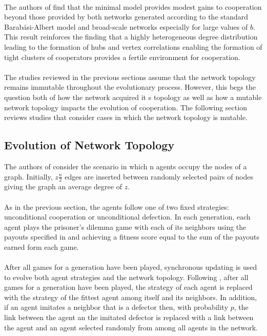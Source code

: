 \documentclass{article}
\begin{document}
	\paragraph{}The authors of \cite{Santos2006a} find that the minimal model provides modest gains to cooperation beyond those provided by both networks generated according to the standard Barab\'{a}si-Albert model and broad-scale networks especially for large values of $b$.  This result reinforces the finding that a highly heterogeneous degree distribution leading to the formation of hubs and vertex correlations enabling the formation of tight clusters of cooperators provides a fertile environment for cooperation.
	\paragraph{}The studies reviewed in the previous sections assume that the network topology remains immutable throughout the evolutionary process.  However, this begs the question both of how the network acquired it s topology as well as how a mutable network topology impacts the evolution of cooperation.  The following section reviews studies that consider cases in which the network topology is mutable.
	
	\subsection{Evolution of Network Topology} \label{evo-net-topology}
	The authors of \cite{Eguiluz2005} consider the scenario in which n agents occupy the nodes of a graph.  Initially, $z\frac{n}{2}$ edges are inserted between randomly selected pairs of nodes giving the graph an average degree of $z$.
	\paragraph{}As in the previous section, the agents follow one of two fixed strategies: unconditional cooperation or unconditional defection.  In each generation, each agent plays the prisoner's dilemma game with each of its neighbors using the payouts specified in \cite{Nowak1992} and achieving a fitness score equal to the sum of the payouts earned form each game.
	\paragraph{}After all games for a generation have been played, synchronous updating is used to evolve both agent strategies and the network topology.  Following \cite{Nowak1992}, after all games for a generation have been played, the strategy of each agent is replaced with the strategy of the fittest agent among itself and its neighbors.  In addition, if an agent imitates a neighbor that is a defector then, with probability $p$, the link between the agent an the imitated defector is replaced with a link between the agent and an agent selected randomly from among all agents in the network.
\end{document}

